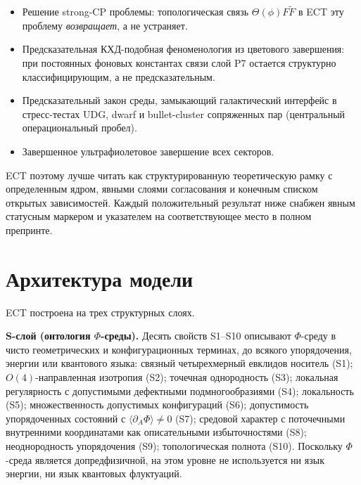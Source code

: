 \documentclass[11pt,a4paper]{article}
\begin{document}
\begin{itemize}[leftmargin=1.4em,itemsep=2pt]
      электрических зарядов, структуры ароматов, матриц смешивания
      CKM/PMNS и иерархии трех поколений Стандартной модели.
\item Решение strong-CP проблемы: топологическая связь
      $\Theta(\phi)F\tilde F$ в ECT эту проблему
      \emph{возвращает}, а не устраняет.
\item Предсказательная КХД-подобная феноменология из цветового
      завершения: при постоянных фоновых константах связи слой P7
      остается структурно классифицирующим, а не предсказательным.
\item Предсказательный закон среды, замыкающий галактический
      интерфейс в стресс-тестах UDG, dwarf и bullet-cluster
      сопряженных пар (центральный операциональный пробел).
\item Завершенное ультрафиолетовое завершение всех секторов.
\end{itemize}

ECT поэтому лучше читать как структурированную теоретическую
рамку с определенным ядром, явными слоями согласования и конечным
списком открытых зависимостей.
Каждый положительный результат ниже снабжен явным статусным
маркером и указателем на соответствующее место в полном препринте.

\section{Архитектура модели}
\label{sec:architecture}

ECT построена на трех структурных слоях.

\textbf{S-слой (онтология $\Phi$-среды).}
Десять свойств S1--S10 описывают $\Phi$-среду в чисто
геометрических и конфигурационных терминах, до всякого
упорядочения, энергии или квантового языка:
связный четырехмерный евклидов носитель (S1);
$O(4)$-направленная изотропия (S2);
точечная однородность (S3);
локальная регулярность с допустимыми дефектными
подмногообразиями (S4);
локальность (S5);
множественность допустимых конфигураций (S6);
допустимость упорядоченных состояний с
$\langle\partial_A\Phi\rangle\neq 0$ (S7);
средовой характер с поточечными внутренними координатами как
описательными избыточностями (S8);
неоднородность упорядочения (S9);
топологическая полнота (S10).
Поскольку $\Phi$-среда является допредфизичной, на этом уровне
не используется ни язык энергии, ни язык квантовых флуктуаций.
\end{document}
